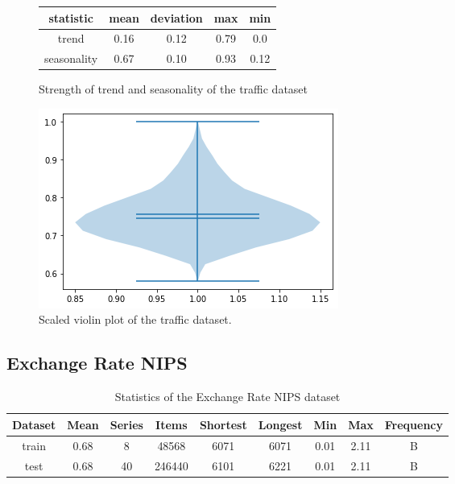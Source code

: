 \begin{figure}[htb]
    \centering
    \begin{center}
        \begin{tabular}{||c | c | c | c | c |}
            \hline
            statistic   & mean & deviation & max  & min  \\
            \hline
            trend       & 0.16 & 0.12      & 0.79 & 0.0  \\
            \hline
            seasonality & 0.67 & 0.10      & 0.93 & 0.12 \\
            \hline
            \hline
        \end{tabular}
        \caption{Strength of trend and seasonality of the traffic dataset}
    \end{center}
    \endminipage\hfill
    \includegraphics[width=\linewidth]{./img/traffic_violin.png}
    \caption{Scaled violin plot of the traffic dataset.}
    \label{fig:traffic_violin}
    \endminipage\hfill
\end{figure}

\clearpage
\subsection{Exchange Rate NIPS}
\begin{table}[htb]
    \begin{tabular}{||c | c c c c c c c c ||}
        \hline
        Dataset & Mean & Series & Items  & Shortest & Longest & Min  & Max  & Frequency \\ [0.5ex]
        \hline\hline
        train   & 0.68 & 8      & 48568  & 6071     & 6071    & 0.01 & 2.11 & B         \\
        \hline
        test    & 0.68 & 40     & 246440 & 6101     & 6221    & 0.01 & 2.11 & B         \\
        \hline
    \end{tabular}
    \caption{Statistics of the Exchange Rate NIPS dataset}
\end{table}

